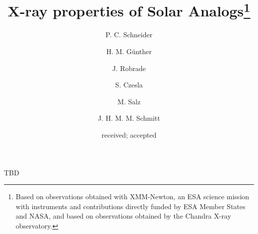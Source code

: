 \documentclass[oldversion]{aa}
\begin{document}
 

\title{X-ray properties of Solar Analogs\thanks{Based on observations obtained with XMM-Newton, an ESA science mission with instruments and contributions directly funded by ESA Member States and NASA, and based on observations obtained by the Chandra X-ray observatory.}}


   \author{P. C. Schneider
          \and
          H. M. G\"unther
          \and
          J. Robrade
          \and
          S. Czesla
          \and
          M. Salz
          \and
          J. H. M. M. Schmitt
          }

     
               
   \date{received; accepted}

 
  \abstract
   {
TBD
     }


   \maketitle
\end{document}
